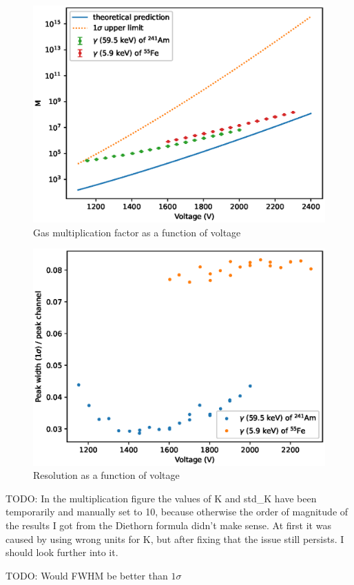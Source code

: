 \documentclass[a4paper]{article}
\newenvironment{todo}{
\color{red}
}
{
}
\begin{document}
\begin{figure}[ht!]
\centering
\includegraphics[width=\textwidth]{fig/python/gas_mult.eps}
\caption{Gas multiplication factor as a function of voltage}
\label{fig:gas_mult}
\end{figure}

\begin{figure}[ht!]
\centering
\includegraphics[width=\textwidth]{fig/python/resolution.eps}
\caption{Resolution as a function of voltage}
\label{fig:gas_mult}
\end{figure}

\FloatBarrier
\begin{todo}
TODO: In the multiplication figure the values of K and std\_K have been temporarily and manually set to 10, because otherwise the order of magnitude of the results I got from the Diethorn formula didn't make sense.
At first it was caused by using wrong units for K, but after fixing that the issue still persists.
I should look further into it.

TODO: Would FWHM be better than $1 \sigma$
\end{todo}
\end{document}
